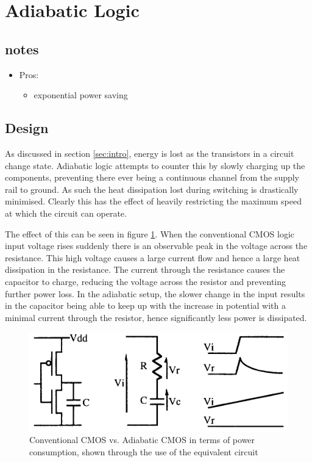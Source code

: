 \section{Adiabatic Logic}
\label{sec:adiabatic}

\subsection{notes}

\begin{itemize}

\item{Pros:}

\begin{itemize}

\item{exponential power saving}

\end{itemize}

\end{itemize}

\subsection{Design}
As discussed in section \ref{sec:intro}, energy is lost as the transistors in a circuit change state.
Adiabatic logic attempts to counter this by slowly charging up the components, preventing there ever being a continuous channel from the supply rail to ground.
As such the heat dissipation lost during switching is drastically minimised.
Clearly this has the effect of heavily restricting the maximum speed at which the circuit can operate.

The effect of this can be seen in figure \ref{fig:convvsadia}.
When the conventional CMOS logic input voltage rises suddenly there is an observable peak in the voltage across the resistance.
This high voltage causes a large current flow and hence a large heat dissipation in the resistance.
The current through the resistance causes the capacitor to charge, reducing the voltage across the resistor and preventing further power loss.
In the adiabatic setup, the slower change in the input results in the capacitor being able to keep up with the increase in potential with a minimal current through the resistor, hence significantly less power is dissipated.

\begin{figure}
	\centering
	\includegraphics[width=\columnwidth]{../../images/conv_vs_adiabatic.png}
	\caption{Conventional CMOS vs. Adiabatic CMOS in terms of power consumption, shown through the use of the equivalent circuit \cite{DynAdiabatic}}
	\label{fig:convvsadia}
\end{figure}

